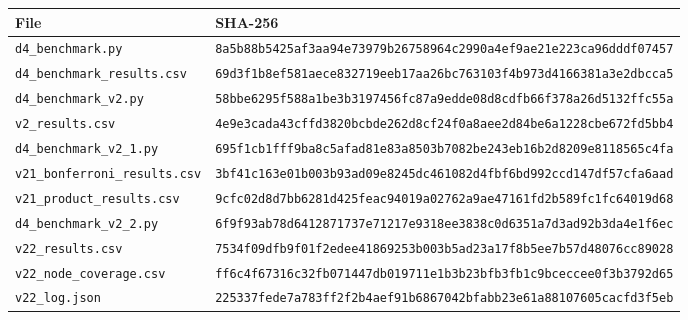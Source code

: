 \begin{tabular}{ll}
\toprule
File & SHA-256 \\
\midrule
\texttt{d4\_benchmark.py} & {\tiny\texttt{8a5b88b5425af3aa94e73979b26758964c2990a4ef9ae21e223ca96dddf07457}} \\
\texttt{d4\_benchmark\_results.csv} & {\tiny\texttt{69d3f1b8ef581aece832719eeb17aa26bc763103f4b973d4166381a3e2dbcca5}} \\
\texttt{d4\_benchmark\_v2.py} & {\tiny\texttt{58bbe6295f588a1be3b3197456fc87a9edde08d8cdfb66f378a26d5132ffc55a}} \\
\texttt{v2\_results.csv} & {\tiny\texttt{4e9e3cada43cffd3820bcbde262d8cf24f0a8aee2d84be6a1228cbe672fd5bb4}} \\
\texttt{d4\_benchmark\_v2\_1.py} & {\tiny\texttt{695f1cb1fff9ba8c5afad81e83a8503b7082be243eb16b2d8209e8118565c4fa}} \\
\texttt{v21\_bonferroni\_results.csv} & {\tiny\texttt{3bf41c163e01b003b93ad09e8245dc461082d4fbf6bd992ccd147df57cfa6aad}} \\
\texttt{v21\_product\_results.csv} & {\tiny\texttt{9cfc02d8d7bb6281d425feac94019a02762a9ae47161fd2b589fc1fc64019d68}} \\
\texttt{d4\_benchmark\_v2\_2.py} & {\tiny\texttt{6f9f93ab78d6412871737e71217e9318ee3838c0d6351a7d3ad92b3da4e1f6ec}} \\
\texttt{v22\_results.csv} & {\tiny\texttt{7534f09dfb9f01f2edee41869253b003b5ad23a17f8b5ee7b57d48076cc89028}} \\
\texttt{v22\_node\_coverage.csv} & {\tiny\texttt{ff6c4f67316c32fb071447db019711e1b3b23bfb3fb1c9bceccee0f3b3792d65}} \\
\texttt{v22\_log.json} & {\tiny\texttt{225337fede7a783ff2f2b4aef91b6867042bfabb23e61a88107605cacfd3f5eb}} \\
\bottomrule
\end{tabular}
